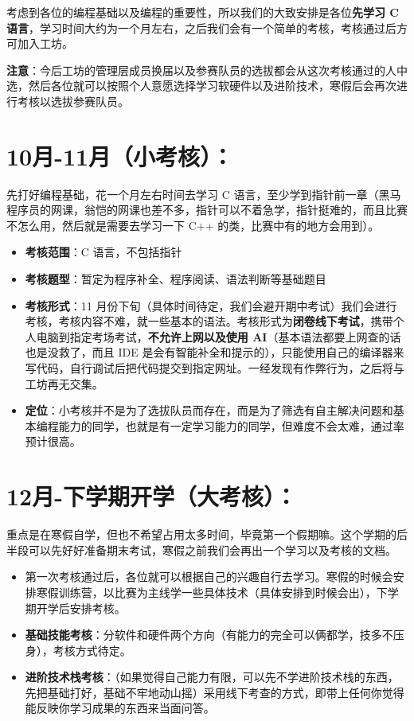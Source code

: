 \documentclass[a4paper,11pt,oneside]{scrreprt}
\begin{document}
考虑到各位的编程基础以及编程的重要性，所以我们的大致安排是各位\textbf{先学习 C 语言}，学习时间大约为一个月左右，之后我们会有一个简单的考核，考核通过后方可加入工坊。

\begin{ctbox}
\textbf{注意}：今后工坊的管理层成员换届以及参赛队员的选拔都会从这次考核通过的人中选，然后各位就可以按照个人意愿选择学习软硬件以及进阶技术，寒假后会再次进行考核以选拔参赛队员。
\end{ctbox}

\section*{10月-11月（小考核）：}
{}

先打好编程基础，花一个月左右时间去学习 C 语言，至少学到指针前一章（黑马程序员的网课，翁恺的网课也差不多，指针可以不着急学，指针挺难的，而且比赛不怎么用，然后就是需要去学习一下 C++ 的类，比赛中有的地方会用到）。

\begin{itemize}
    \item \textbf{考核范围}：C 语言，不包括指针
    \item \textbf{考核题型}：暂定为程序补全、程序阅读、语法判断等基础题目
    \item \textbf{考核形式}：11 月份下旬（具体时间待定，我们会避开期中考试）我们会进行考核，考核内容不难，就一些基本的语法。考核形式为\textbf{闭卷线下考试}，携带个人电脑到指定考场考试，\textbf{不允许上网以及使用 AI}（基本语法都要上网查的话也是没救了，而且 IDE 是会有智能补全和提示的），只能使用自己的编译器来写代码，自行调试后把代码提交到指定网址。一经发现有作弊行为，之后将与工坊再无交集。
    \item \textbf{定位}：小考核并不是为了选拔队员而存在，而是为了筛选有自主解决问题和基本编程能力的同学，也就是有一定学习能力的同学，但难度不会太难，通过率预计很高。
\end{itemize}

\section*{12月-下学期开学（大考核）：}
{}

重点是在寒假自学，但也不希望占用太多时间，毕竟第一个假期嘛。这个学期的后半段可以先好好准备期末考试，寒假之前我们会再出一个学习以及考核的文档。

\begin{itemize}
    \item 第一次考核通过后，各位就可以根据自己的兴趣自行去学习。寒假的时候会安排寒假训练营，以比赛为主线学一些具体技术（具体安排到时候会出），下学期开学后安排考核。
    \item \textbf{基础技能考核}：分软件和硬件两个方向（有能力的完全可以俩都学，技多不压身），考核方式待定。
    \item \textbf{进阶技术栈考核}：（如果觉得自己能力有限，可以先不学进阶技术栈的东西，先把基础打好，基础不牢地动山摇）采用线下考查的方式，即带上任何你觉得能反映你学习成果的东西来当面问答。
\end{itemize}
\end{document}
